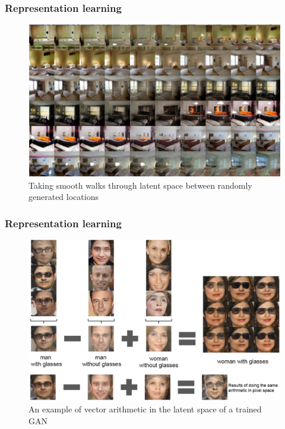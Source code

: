 \documentclass{beamer}
\begin{document}
\begin{frame}
    \frametitle{Representation learning}
    \begin{figure}
        \caption{Taking smooth walks through latent space between randomly generated locations}
        \includegraphics[height=0.6\textheight]{Figure_9.pdf}
    \end{figure}
\end{frame}

\begin{frame}
    \frametitle{Representation learning}
    \begin{figure}
        \caption{An example of vector arithmetic in the latent space of a trained GAN}
        \includegraphics{Figure_10.pdf}
    \end{figure}
\end{frame}
\end{document}
